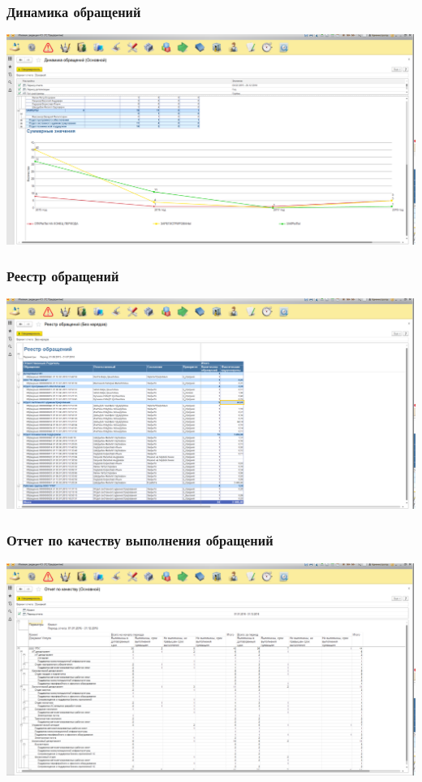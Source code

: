 \documentclass{../industrial-development}
\begin{document}
\begin{frame} \frametitle{Динамика обращений}
\centerline{\includegraphics[width=\textwidth]{pic11.png}}
\end{frame}
\lecturenotes

\begin{frame} \frametitle{Реестр обращений}
\centerline{\includegraphics[width=\textwidth]{pic14.png}}
\end{frame}
\lecturenotes

\begin{frame} \frametitle{Отчет по качеству выполнения обращений}
\centerline{\includegraphics[width=\textwidth]{pic13.png}}
\end{frame}
\lecturenotes
\end{document}
